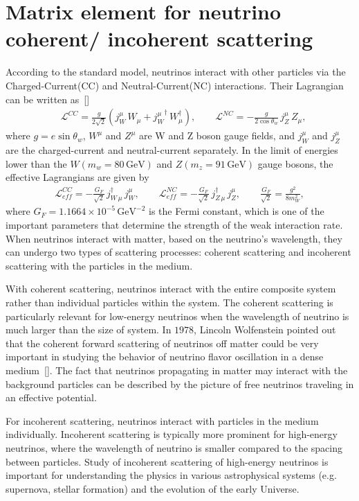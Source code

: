 
\section{Matrix element for neutrino coherent/ incoherent scattering}
 According to the standard model, neutrinos interact with other particles via the Charged-Current(CC) and Neutral-Current(NC) interactions. Their Lagrangian can be written as~[\cite{Giunti:2007ry}]
\begin{align}
&\mathcal{L}^{CC}=\frac{g}{2\sqrt{2}}\left(j^\mu_W\,W_\mu+{j^\mu_W}^\dagger\,W^\dagger_\mu\right),\qquad\mathcal{L}^{NC}=-\frac{g}{2\cos{\theta_w}}\,j^\mu_Z\,Z_\mu,
\end{align}
where $g=e\sin\theta_w$, $W^\mu$ and $Z^\mu$ are W and Z boson gauge fields, and $j^\mu_W$ and $j^\mu_Z$ are the charged-current and neutral-current separately. In the limit of energies lower than the $W(m_w=80\,\mathrm{GeV})$ and $Z(m_z=91\,\mathrm{GeV})$ gauge bosons, the effective Lagrangians are given by
\begin{align}\label{L_low}
\mathcal{L}^{CC}_{eff}=-\frac{G_F}{\sqrt{2}}\,j^\dagger_{W\,\mu}\,j^\mu_W,\qquad
\mathcal{L}^{NC}_{eff}=-\frac{G_F}{\sqrt{2}}\,j^\dagger_{Z\,\mu}\,j^\mu_Z,\qquad \frac{G_F}{\sqrt{2}}=\frac{g^2}{8m^2_W},
\end{align}
where $G_F=1.1664\times10^{-5}\,\mathrm{GeV}^{-2}$ is the Fermi constant, which is one of the important parameters that determine the strength of the weak interaction rate. When neutrinos interact with matter, based on the neutrino's wavelength, they can undergo two types of scattering processes: coherent scattering and incoherent scattering with the particles in the medium. 

With coherent scattering, neutrinos interact with the entire  composite system rather than individual particles within the system. The coherent scattering is particularly relevant for low-energy neutrinos when the wavelength of neutrino is much larger than the size of system. In $1978$, Lincoln Wolfenstein pointed out that the coherent forward scattering of neutrinos off matter could be very important in studying the behavior of neutrino flavor oscillation in a dense medium~[\cite{PhysRevD.17.2369}]. The fact that neutrinos propagating in matter may interact with the background particles can be described by the picture of free neutrinos traveling in an effective potential.

For incoherent scattering, neutrinos interact with particles in the medium individually. Incoherent scattering is typically more prominent for high-energy neutrinos, where the wavelength of neutrino is smaller compared to the spacing between particles. Study of incoherent scattering of high-energy neutrinos is important for understanding the physics in various astrophysical systems (e.g. supernova, stellar formation) and the evolution of the early Universe.

